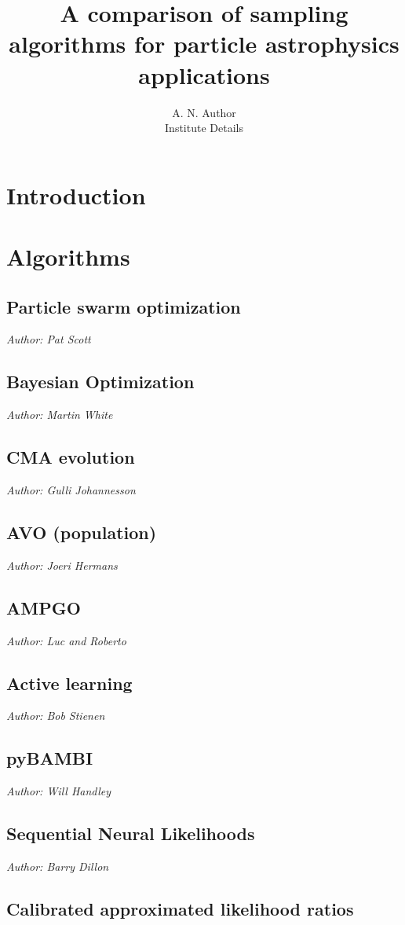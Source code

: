\documentclass[12pt]{JHEP3}
\title{A comparison of sampling algorithms for particle astrophysics applications}
\author{A. N. Author\\
Institute Details}
\begin{document}
\section{Introduction}

\section{Algorithms}
\subsection{Particle swarm optimization}
\emph{Author: Pat Scott}

\subsection{Bayesian Optimization}

\emph{Author: Martin White}

\subsection{CMA evolution}
\emph{Author: Gulli Johannesson}

\subsection{AVO (population)}
\emph{Author: Joeri Hermans}

\subsection{AMPGO}
\emph{Author: Luc and Roberto} 

\subsection{Active learning}
\emph{Author: Bob Stienen}

\subsection{pyBAMBI}

\emph{Author: Will Handley}

\subsection{Sequential Neural Likelihoods}
\emph{Author: Barry Dillon}

\subsection{Calibrated approximated likelihood ratios}
\end{document}
